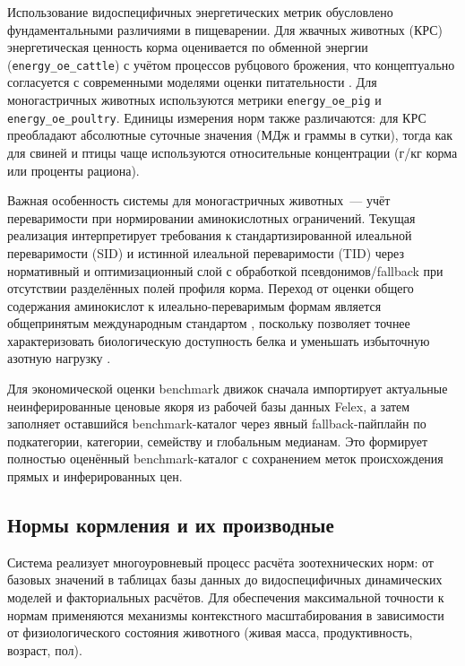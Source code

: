 \documentclass[a4paper,fleqn]{cas-sc}
\begin{document}
Использование видоспецифичных энергетических метрик обусловлено фундаментальными различиями в пищеварении. Для жвачных животных (КРС) энергетическая ценность корма оценивается по обменной энергии (\texttt{energy\_oe\_cattle}) с учётом процессов рубцового брожения, что концептуально согласуется с современными моделями оценки питательности \citep{sauvant2018, nASEM2021}. Для моногастричных животных используются метрики \texttt{energy\_oe\_pig} и \texttt{energy\_oe\_poultry}. Единицы измерения норм также различаются: для КРС преобладают абсолютные суточные значения (МДж и граммы в сутки), тогда как для свиней и птицы чаще используются относительные концентрации (г/кг корма или проценты рациона).

Важная особенность системы для моногастричных животных~--- учёт переваримости при нормировании аминокислотных ограничений. Текущая реализация интерпретирует требования к стандартизированной илеальной переваримости (SID) и истинной илеальной переваримости (TID) через нормативный и оптимизационный слой с обработкой псевдонимов/fallback при отсутствии разделённых полей профиля корма. Переход от оценки общего содержания аминокислот к илеально-переваримым формам является общепринятым международным стандартом \citep{stein2007, nRC2012, nRC1994}, поскольку позволяет точнее характеризовать биологическую доступность белка и уменьшать избыточную азотную нагрузку \citep{pomar2021, deLange2012, vanmilgen2015}.

Для экономической оценки benchmark движок сначала импортирует актуальные неинферированные ценовые якоря из рабочей базы данных Felex, а затем заполняет оставшийся benchmark-каталог через явный fallback-пайплайн по подкатегории, категории, семейству и глобальным медианам. Это формирует полностью оценённый benchmark-каталог с сохранением меток происхождения прямых и инферированных цен.

\subsection{Нормы кормления и их производные}\label{subsec:norms}

Система реализует многоуровневый процесс расчёта зоотехнических норм: от базовых значений в таблицах базы данных до видоспецифичных динамических моделей и факториальных расчётов. Для обеспечения максимальной точности к нормам применяются механизмы контекстного масштабирования в зависимости от физиологического состояния животного (живая масса, продуктивность, возраст, пол).
\end{document}

